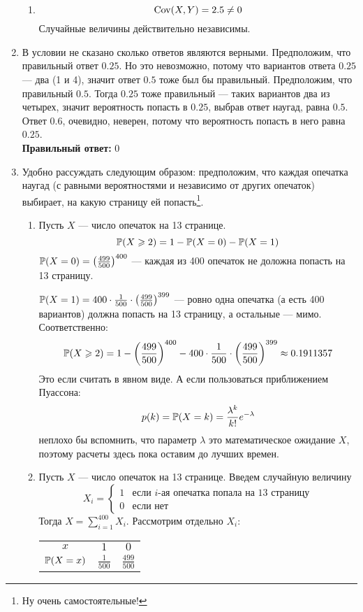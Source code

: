 \begin{enumerate}
\begin{enumerate}
\item
\[
\Cov(X, Y) = 2.5 \ne 0
\]
Случайные величины действительно независимы.
\end{enumerate}

\item
В условии не сказано сколько ответов являются верными. Предположим, что правильный
ответ $0.25$. Но это невозможно, потому что вариантов ответа $0.25$ — два (1 и 4),
значит ответ $0.5$ тоже был бы правильный. Предположим, что правильный $0.5$.
Тогда $0.25$ тоже правильный — таких вариантов два из четырех, значит вероятность
попасть в $0.25$, выбрав ответ наугад, равна $0.5$. Ответ $0.6$, очевидно, неверен,
потому что вероятность попасть в него равна $0.25$. \\
\textbf{Правильный ответ:} $0$

\item
Удобно рассуждать следующим образом: предположим, что каждая опечатка наугад
(с равными вероятностями и независимо от других опечаток) выбирает, на какую
страницу ей попасть\footnote[1]{Ну очень самостоятельные!}.

\begin{enumerate}
\item Пусть $X$ — число опечаток на 13 странице.
\[
\P(X \geqslant 2) = 1 - \P(X=0) - \P(X=1)
\]
$\P(X=0) = \left( \frac{499}{500} \right)^{400}$ — каждая из 400 опечаток
не доложна попасть на 13 страницу.

$\P(X=1) = 400\cdot\frac{1}{500}\cdot\left( \frac{499}{500} \right)^{399}$ —
ровно одна опечатка (а есть 400 вариантов) должна попасть на 13 страницу,
а остальные — мимо. Соответственно:
\[
\P(X \geqslant 2) = 1 - \left( \frac{499}{500} \right)^{400} -
400\cdot\frac{1}{500}\cdot\left( \frac{499}{500} \right)^{399} \approx 0.1911357
\]
Это если считать в явном виде. А если пользоваться приближением Пуассона:
\[
p(k) = \P(X = k) = \frac{\lambda^k}{k!}e^{-\lambda}
\]
неплохо бы вспомнить, что параметр $\lambda$ это математическое ожидание $X$,
поэтому расчеты здесь пока оставим до лучших времен.

\item Пусть $X$ — число опечаток на 13 странице. Введем случайную величину
\[
X_i =
\begin{cases}
1 & \text{если } i\text{-ая опечатка попала на 13 страницу}\\
0 & \text{если нет}
\end{cases}
\]
Тогда $X = \sum\limits_{i=1}^{400}X_i$. Рассмотрим отдельно $X_i$:

\begin{center}
\begin{tabular}{@{}ccc@{}}
\toprule
$x$         & $1$             & $0$               \\
$\P(X=x)$ & $\frac{1}{500}$ & $\frac{499}{500}$ \\ \bottomrule
\end{tabular}
\end{center}


\end{enumerate}
\end{enumerate}
